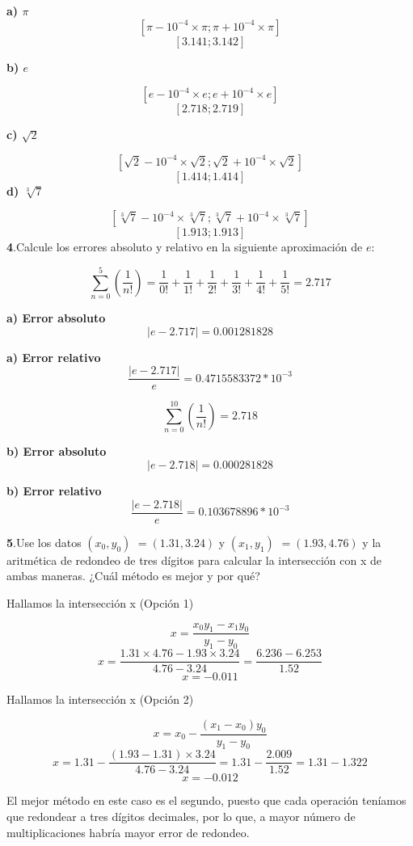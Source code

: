 \documentclass[12pt]{article}
\begin{document}
\textbf{a) $\pi$}
$$
[\pi - 10^{-4}\times \pi ; \pi + 10^{-4}\times \pi]
$$
$$
[3.141; 3.142]
$$

\textbf{b) $e$}

$$
[e - 10^{-4}\times e ; e + 10^{-4}\times e]
$$
$$
[2.718; 2.719]
$$

\textbf{c) $\sqrt{2}$ }

$$
[\sqrt{2} - 10^{-4}\times \sqrt{2} ; \sqrt{2} + 10^{-4}\times \sqrt{2}]
$$
$$
[1.414; 1.414]
$$
\textbf{d) $\sqrt[3]{7}$}

$$
[\sqrt[3]{7} - 10^{-4}\times \sqrt[3]{7} ; \sqrt[3]{7} + 10^{-4}\times \sqrt[3]{7}]
$$
$$
[1.913; 1.913]
$$
\textbf{4}.Calcule los errores absoluto y relativo en la siguiente aproximación de $e$:

$$ 
\sum_{n = 0}^{5}(\frac{1}{n!}) = \frac{1}{0!} + \frac{1}{1!}+\frac{1}{2!}+\frac{1}{3!}+\frac{1}{4!}+\frac{1}{5!}
=2.717    
$$

\textbf{a) Error absoluto}
$$\left| e - 2.717 \right| = 0.001281828$$

\textbf{a) Error relativo}
$$\frac{\left| e - 2.717 \right|}{e} = 0.4715583372 * 10^{-3}$$

$$ 
\sum_{n = 0}^{10}(\frac{1}{n!}) 
=  2.718 
$$

\textbf{b) Error absoluto}
$$\left| e - 2.718 \right| = 0.000281828$$

\textbf{b) Error relativo}
$$\frac{\left| e - 2.718 \right|}{e} = 0.103678896 * 10^{-3}$$

\textbf{5}.Use los datos $(x_0 , y_0)$ $= (1.31, 3.24)$ y $( x_1 , y_1)$  $= (1.93, 4.76)$ y la aritmética de redondeo de tres dígitos para calcular la intersección con x de ambas maneras. ¿Cuál método es mejor y por qué?

Hallamos la intersección x (Opción 1)

$$x = \frac{x_0y_1-x_1y_0}{y_1-y_0}$$
$$
x = \frac{1.31\times 4.76-1.93\times 3.24}{4.76-3.24}
= \frac{6.236-6.253}{1.52}
$$
$$x = -0.011$$

Hallamos la intersección x (Opción 2)

$$x = x_0 - \frac{(x_1-x_0)y_0}{y_1-y_0}$$
$$
x = 1.31 - \frac{(1.93-1.31)\times 3.24}{4.76-3.24}
= 1.31 -\frac{2.009}{1.52}
= 1.31 - 1.322
$$
$$x = -0.012$$

El mejor método en este caso es el segundo, puesto que cada operación teníamos que redondear a tres dígitos decimales, por lo que, a mayor número de multiplicaciones habría mayor error de redondeo.

\vspace{0.5cm}
\end{document}
